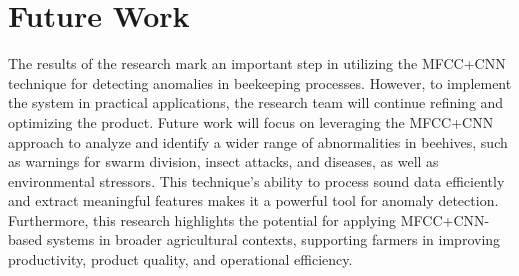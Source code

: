 \section{Future Work}

The results of the research mark an important step in utilizing the MFCC+CNN technique
for detecting anomalies in beekeeping processes. However, to implement the system in
practical applications, the research team will continue refining and optimizing the product.
Future work will focus on leveraging the MFCC+CNN approach to analyze and identify a wider
range of abnormalities in beehives, such as warnings for swarm division, insect attacks, 
and diseases, as well as environmental stressors. This technique’s ability to process 
sound data efficiently and extract meaningful features makes it a powerful tool for 
anomaly detection. Furthermore, this research highlights the potential for applying 
MFCC+CNN-based systems in broader agricultural contexts, supporting farmers in improving 
productivity, product quality, and operational efficiency.